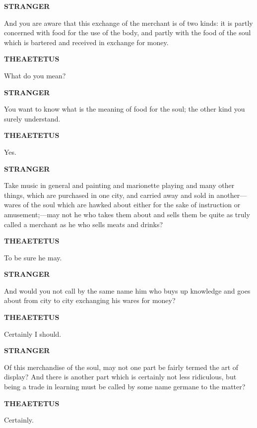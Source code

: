 \documentclass[11pt,letter]{article}
\begin{document}
\par \textbf{STRANGER}
\par   And you are aware that this exchange of the merchant is of two kinds:  it is partly concerned with food for the use of the body, and partly with the food of the soul which is bartered and received in exchange for money.

\par \textbf{THEAETETUS}
\par   What do you mean?

\par \textbf{STRANGER}
\par   You want to know what is the meaning of food for the soul; the other kind you surely understand.

\par \textbf{THEAETETUS}
\par   Yes.

\par \textbf{STRANGER}
\par   Take music in general and painting and marionette playing and many other things, which are purchased in one city, and carried away and sold in another—wares of the soul which are hawked about either for the sake of instruction or amusement;—may not he who takes them about and sells them be quite as truly called a merchant as he who sells meats and drinks?

\par \textbf{THEAETETUS}
\par   To be sure he may.

\par \textbf{STRANGER}
\par   And would you not call by the same name him who buys up knowledge and goes about from city to city exchanging his wares for money?

\par \textbf{THEAETETUS}
\par   Certainly I should.

\par \textbf{STRANGER}
\par   Of this merchandise of the soul, may not one part be fairly termed the art of display? And there is another part which is certainly not less ridiculous, but being a trade in learning must be called by some name germane to the matter?

\par \textbf{THEAETETUS}
\par   Certainly.
\end{document}
